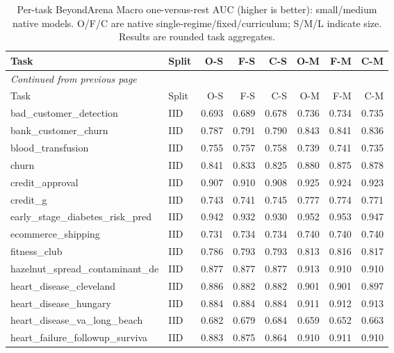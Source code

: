 \begin{longtable}{@{}p{3.95cm}lrrrrrr@{}}
\caption{Per-task BeyondArena Macro one-versus-rest AUC (higher is better): small/medium native models. O/F/C are native single-regime/fixed/curriculum; S/M/L indicate size. Results are rounded task aggregates.}\label{tab:aucsm}\\
\toprule Task & Split & O-S & F-S & C-S & O-M & F-M & C-M\\\midrule
\endfirsthead
\multicolumn{8}{l}{\emph{Continued from previous page}}\\\toprule
Task & Split & O-S & F-S & C-S & O-M & F-M & C-M\\\midrule\endhead
\bottomrule\endfoot
bad\_\allowbreak{}customer\_\allowbreak{}detection & IID & 0.693 & 0.689 & 0.678 & 0.736 & 0.734 & 0.735\\
bank\_\allowbreak{}customer\_\allowbreak{}churn & IID & 0.787 & 0.791 & 0.790 & 0.843 & 0.841 & 0.836\\
blood\_\allowbreak{}transfusion & IID & 0.755 & 0.757 & 0.758 & 0.739 & 0.741 & 0.735\\
churn & IID & 0.841 & 0.833 & 0.825 & 0.880 & 0.875 & 0.878\\
credit\_\allowbreak{}approval & IID & 0.907 & 0.910 & 0.908 & 0.925 & 0.924 & 0.923\\
credit\_\allowbreak{}g & IID & 0.743 & 0.741 & 0.745 & 0.777 & 0.774 & 0.771\\
early\_\allowbreak{}stage\_\allowbreak{}diabetes\_\allowbreak{}risk\_\allowbreak{}pred & IID & 0.942 & 0.932 & 0.930 & 0.952 & 0.953 & 0.947\\
ecommerce\_\allowbreak{}shipping & IID & 0.731 & 0.734 & 0.734 & 0.740 & 0.740 & 0.740\\
fitness\_\allowbreak{}club & IID & 0.786 & 0.793 & 0.793 & 0.813 & 0.816 & 0.817\\
hazelnut\_\allowbreak{}spread\_\allowbreak{}contaminant\_\allowbreak{}de & IID & 0.877 & 0.877 & 0.877 & 0.913 & 0.910 & 0.910\\
heart\_\allowbreak{}disease\_\allowbreak{}cleveland & IID & 0.886 & 0.882 & 0.882 & 0.901 & 0.901 & 0.897\\
heart\_\allowbreak{}disease\_\allowbreak{}hungary & IID & 0.884 & 0.884 & 0.884 & 0.911 & 0.912 & 0.913\\
heart\_\allowbreak{}disease\_\allowbreak{}va\_\allowbreak{}long\_\allowbreak{}beach & IID & 0.682 & 0.679 & 0.684 & 0.659 & 0.652 & 0.663\\
heart\_\allowbreak{}failure\_\allowbreak{}followup\_\allowbreak{}surviva & IID & 0.883 & 0.875 & 0.864 & 0.910 & 0.911 & 0.910\\

\end{longtable}
